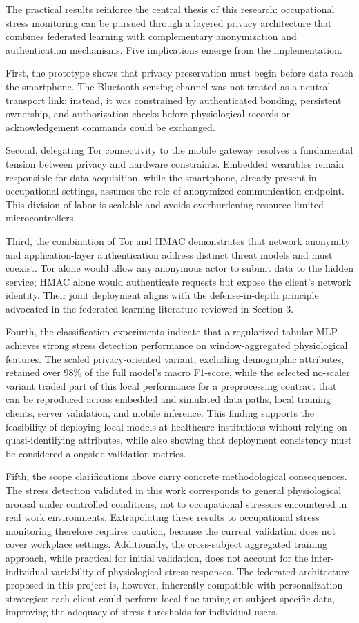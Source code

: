 \documentclass[12pt]{article}
\begin{document}
The practical results reinforce the central thesis of this research: occupational stress monitoring can be pursued through a layered privacy architecture that combines federated learning with complementary anonymization and authentication mechanisms. Five implications emerge from the implementation.

First, the prototype shows that privacy preservation must begin before data reach the smartphone. The Bluetooth sensing channel was not treated as a neutral transport link; instead, it was constrained by authenticated bonding, persistent ownership, and authorization checks before physiological records or acknowledgement commands could be exchanged.

Second, delegating Tor connectivity to the mobile gateway resolves a fundamental tension between privacy and hardware constraints. Embedded wearables remain responsible for data acquisition, while the smartphone, already present in occupational settings, assumes the role of anonymized communication endpoint. This division of labor is scalable and avoids overburdening resource-limited microcontrollers.

Third, the combination of Tor and HMAC demonstrates that network anonymity and application-layer authentication address distinct threat models and must coexist. Tor alone would allow any anonymous actor to submit data to the hidden service; HMAC alone would authenticate requests but expose the client's network identity. Their joint deployment aligns with the defense-in-depth principle advocated in the federated learning literature reviewed in Section 3.

Fourth, the classification experiments indicate that a regularized tabular MLP achieves strong stress detection performance on window-aggregated physiological features. The scaled privacy-oriented variant, excluding demographic attributes, retained over 98\% of the full model's macro F1-score, while the selected no-scaler variant traded part of this local performance for a preprocessing contract that can be reproduced across embedded and simulated data paths, local training clients, server validation, and mobile inference. This finding supports the feasibility of deploying local models at healthcare institutions without relying on quasi-identifying attributes, while also showing that deployment consistency must be considered alongside validation metrics.

Fifth, the scope clarifications above carry concrete methodological consequences. The stress detection validated in this work corresponds to general physiological arousal under controlled conditions, not to occupational stressors encountered in real work environments. Extrapolating these results to occupational stress monitoring therefore requires caution, because the current validation does not cover workplace settings. Additionally, the cross-subject aggregated training approach, while practical for initial validation, does not account for the inter-individual variability of physiological stress responses. The federated architecture proposed in this project is, however, inherently compatible with personalization strategies: each client could perform local fine-tuning on subject-specific data, improving the adequacy of stress thresholds for individual users.
\end{document}
